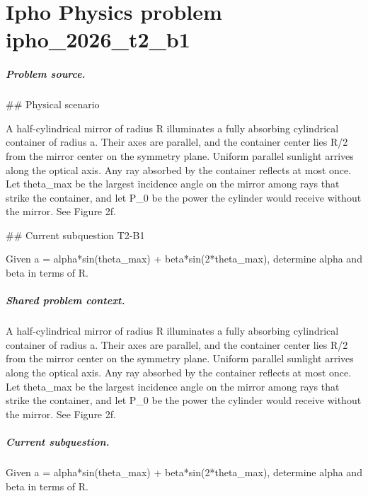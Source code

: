 
\chapter{Ipho Physics problem ipho\_2026\_t2\_b1}
\label{ch:IPhO2026Problems_problem_ipho_2026_t2_b1}

\paragraph{Problem source.}
\#\# Physical scenario

A half-cylindrical mirror of radius R illuminates a fully absorbing cylindrical
container of radius a.  Their axes are parallel, and the container center lies
R/2 from the mirror center on the symmetry plane.  Uniform parallel sunlight
arrives along the optical axis.  Any ray absorbed by the container reflects at
most once.  Let theta\_max be the largest incidence angle on the mirror among
rays that strike the container, and let P\_0 be the power the cylinder would
receive without the mirror.  See Figure 2f.

\#\# Current subquestion T2-B1

Given a = alpha*sin(theta\_max) + beta*sin(2*theta\_max), determine alpha and beta in terms of R.

\paragraph{Shared problem context.}
A half-cylindrical mirror of radius R illuminates a fully absorbing cylindrical
container of radius a.  Their axes are parallel, and the container center lies
R/2 from the mirror center on the symmetry plane.  Uniform parallel sunlight
arrives along the optical axis.  Any ray absorbed by the container reflects at
most once.  Let theta\_max be the largest incidence angle on the mirror among
rays that strike the container, and let P\_0 be the power the cylinder would
receive without the mirror.  See Figure 2f.

\paragraph{Current subquestion.}
Given a = alpha*sin(theta\_max) + beta*sin(2*theta\_max), determine alpha and beta in terms of R.

